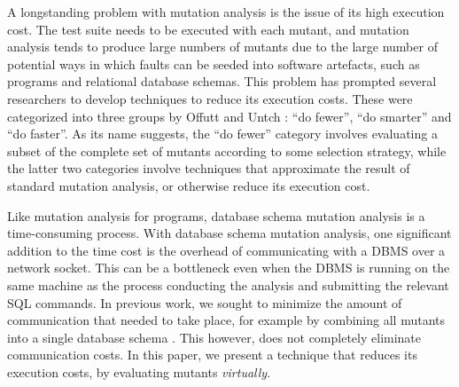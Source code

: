 A longstanding problem with mutation analysis is the issue of its high execution cost. The test suite needs to be executed with each mutant, and mutation analysis tends to produce large numbers of mutants due to the large number of potential ways in which faults can be seeded into software artefacts, such as programs and relational database schemas. This
problem
has prompted several researchers to develop techniques to reduce its execution costs. These were categorized into three groups by Offutt and Untch \cite{Offutt2001}: ``do fewer'', ``do smarter'' and ``do faster''. As its name suggests, the ``do fewer'' category involves evaluating a subset of the complete set of mutants according to some selection strategy, while the latter two categories involve techniques that approximate the result of standard mutation analysis, or otherwise reduce its execution cost.

Like mutation analysis for programs, database schema mutation analysis is a time-consuming process. With database schema mutation analysis, one significant addition to the time cost is the overhead of communicating with a DBMS over a network socket. This can be a bottleneck even when the DBMS is running on the same machine as the process conducting the analysis and submitting the relevant SQL commands. In previous work, we sought to minimize the amount of communication that needed to take place, for example by combining all mutants into a single database schema \cite{Wright2013}. This however, does not completely eliminate communication costs. In this paper, we present a technique that reduces its execution costs, by evaluating mutants {\it virtually}.


